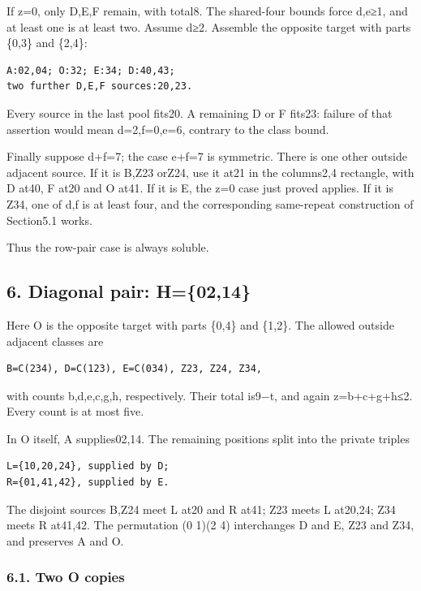 \documentclass[
  10pt,
]{article}
\begin{document}
If z=0, only D,E,F remain, with total8. The shared-four bounds force
d,e≥1, and at least one is at least two. Assume d≥2. Assemble the
opposite target with parts \{0,3\} and \{2,4\}:

\begin{verbatim}
A:02,04; O:32; E:34; D:40,43;
two further D,E,F sources:20,23.
\end{verbatim}

Every source in the last pool fits20. A remaining D or F fits23: failure
of that assertion would mean d=2,f=0,e=6, contrary to the class bound.

Finally suppose d+f=7; the case e+f=7 is symmetric. There is one other
outside adjacent source. If it is B,Z23 orZ24, use it at21 in the
columns2,4 rectangle, with D at40, F at20 and O at41. If it is E, the
z=0 case just proved applies. If it is Z34, one of d,f is at least four,
and the corresponding same-repeat construction of Section5.1 works.

Thus the row-pair case is always soluble.

\hypertarget{diagonal-pair-h0214}{%
\subsection*{6. Diagonal pair: H=\{02,14\}}\label{diagonal-pair-h0214}}

Here O is the opposite target with parts \{0,4\} and \{1,2\}. The
allowed outside adjacent classes are

\begin{verbatim}
B=C(234), D=C(123), E=C(034), Z23, Z24, Z34,
\end{verbatim}

with counts b,d,e,c,g,h, respectively. Their total is9−t, and again
z=b+c+g+h≤2. Every count is at most five.

In O itself, A supplies02,14. The remaining positions split into the
private triples

\begin{verbatim}
L={10,20,24}, supplied by D;
R={01,41,42}, supplied by E.
\end{verbatim}

The disjoint sources B,Z24 meet L at20 and R at41; Z23 meets L at20,24;
Z34 meets R at41,42. The permutation (0 1)(2 4) interchanges D and E,
Z23 and Z34, and preserves A and O.

\hypertarget{two-o-copies-1}{%
\subsubsection*{6.1. Two O copies}\label{two-o-copies-1}}
\end{document}

